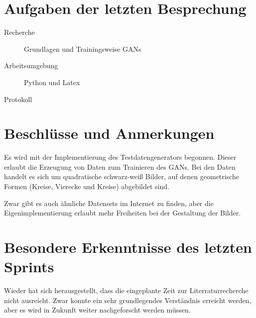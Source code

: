 
\newcommand{\Titel}{2. Protokoll}
\newcommand{\Teilnehmer}{Jonas Bürgel, Patrick Welter}
\newcommand{\DatumUndZeit}{01.11.2021 20:00-20:15}
\newcommand{\Ort}{Discord Meeting}
\newcommand{\Thema}{Literaturrecherche}


\section{Aufgaben der letzten Besprechung}
\begin{description}
	\item[Recherche] Grundlagen und Trainingsweise GANs  \halfcheck
	\item[Arbeitsumgebung] Python und Latex  \fullcheck
	\item[Protokoll]  \fullcheck
\end{description}

\section{Beschlüsse und Anmerkungen}
\begin{description}[style=nextline]
	\item[Testdatengenerator]
	Es wird mit der Implementierung des Testdatengenerators begonnen.
	Dieser erlaubt die Erzeugung von Daten zum Trainieren des GANs.
	Bei den Daten handelt es sich um quadratische schwarz-weiß Bilder, auf denen geometrische Formen (Kreise, Vierecke und Kreise) abgebildet sind.
	
	Zwar gibt es auch ähnliche Datensets im Internet zu finden, aber die Eigenimplementierung erlaubt mehr Freiheiten bei der Gestaltung der Bilder.
\end{description}

\section{Besondere Erkenntnisse des letzten Sprints}
\begin{description}[style=nextline]
	\item[Umfang Thema]
	Wieder hat sich herausgestellt, dass die eingeplante Zeit zur Literraturrecherche nicht ausreicht.
	Zwar konnte ein sehr grundlegendes Verständnis erreicht werden, aber es wird in Zukunft weiter nachgeforscht werden müssen.
\end{description}

